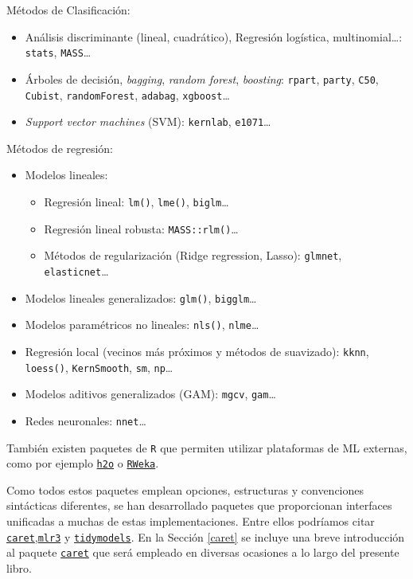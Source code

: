 \documentclass[
]{book}
\theoremstyle{break}
\theoremstyle{definition}
\theoremstyle{definition}
\theoremstyle{definition}
\theoremstyle{definition}
\theoremstyle{remark}
\begin{document}
Métodos de Clasificación:

\begin{itemize}
\item
  Análisis discriminante (lineal, cuadrático), Regresión logística, multinomial\ldots:
  \texttt{stats}, \texttt{MASS}\ldots{}
\item
  Árboles de decisión, \emph{bagging}, \emph{random forest}, \emph{boosting}:
  \texttt{rpart}, \texttt{party}, \texttt{C50}, \texttt{Cubist}, \texttt{randomForest}, \texttt{adabag}, \texttt{xgboost}\ldots{}
\item
  \emph{Support vector machines} (SVM):
  \texttt{kernlab}, \texttt{e1071}\ldots{}
\end{itemize}

Métodos de regresión:

\begin{itemize}
\item
  Modelos lineales:

  \begin{itemize}
  \item
    Regresión lineal: \texttt{lm()}, \texttt{lme()}, \texttt{biglm}\ldots{}
  \item
    Regresión lineal robusta: \texttt{MASS::rlm()}\ldots{}
  \item
    Métodos de regularización (Ridge regression, Lasso):
    \texttt{glmnet}, \texttt{elasticnet}\ldots{}
  \end{itemize}
\item
  Modelos lineales generalizados: \texttt{glm()}, \texttt{bigglm}\ldots{}
\item
  Modelos paramétricos no lineales: \texttt{nls()}, \texttt{nlme}\ldots{}
\item
  Regresión local (vecinos más próximos y métodos de suavizado):
  \texttt{kknn}, \texttt{loess()}, \texttt{KernSmooth}, \texttt{sm}, \texttt{np}\ldots{}
\item
  Modelos aditivos generalizados (GAM): \texttt{mgcv}, \texttt{gam}\ldots{}
\item
  Redes neuronales: \texttt{nnet}\ldots{}
\end{itemize}

También existen paquetes de \texttt{R} que permiten utilizar plataformas de ML externas, como por ejemplo \href{https://github.com/h2oai/h2o-3/tree/master/h2o-r}{\texttt{h2o}} o \href{https://CRAN.R-project.org/package=RWeka}{\texttt{RWeka}}.

Como todos estos paquetes emplean opciones, estructuras y convenciones sintácticas diferentes, se han desarrollado paquetes que proporcionan interfaces unificadas a muchas de estas implementaciones.
Entre ellos podríamos citar \href{https://topepo.github.io/caret}{\texttt{caret}},\href{https://mlr3.mlr-org.com}{\texttt{mlr3}} y \href{https://www.tidymodels.org}{\texttt{tidymodels}}.
En la Sección \ref{caret} se incluye una breve introducción al paquete \href{https://topepo.github.io/caret}{\texttt{caret}} que será empleado en diversas ocasiones a lo largo del presente libro.
\end{document}
